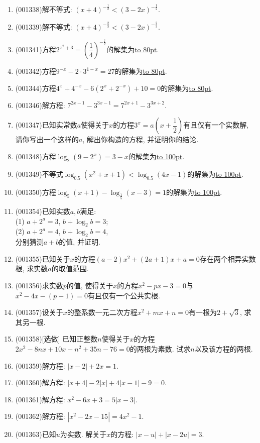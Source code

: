 \documentclass[10pt,a4paper]{article}
\newcommand{\blank}[1]{\underline{\hbox to #1pt{}}}
\begin{document}
\begin{enumerate}[1.]
\item {\tiny (001338)}解不等式: $(x+4)^{-\frac{1}{2}}<(3-2x)^{-\frac{1}{2}}$.
\item {\tiny (001339)}解不等式: $(x+4)^{-\frac{2}{3}}<(3-2x)^{-\frac{2}{3}}$.
\item {\tiny (001341)}方程$2^{x^2+3}=\left(\dfrac{1}{4}\right)^{-\frac{7}{2}}$的解集为\blank{80}.
\item {\tiny (001342)}方程$9^{-x}-2\cdot 3^{1-x}=27$的解集为\blank{80}.
\item {\tiny (001344)}方程$4^x+4^{-x}-6(2^x+2^{-x})+10=0$的解集为\blank{80}.
\item {\tiny (001346)}解方程: $7^{2x-1}-3^{3x-1}=7^{2x+1}-3^{3x+2}$.
\item {\tiny (001347)}已知实常数$a$使得关于$x$的方程$3^x=a\left(x+\dfrac{1}{2}\right)$有且仅有一个实数解, 请你写出一个这样的$a$, 解出你构造的方程, 并证明你的结论.
\item {\tiny (001348)}方程$\log_2(9-2^x)=3-x$的解集为\blank{100}.
\item {\tiny (001349)}不等式$\log_{0.5}(x^2+x+1)<\log_{0.5}(4x-1)$的解集为\blank{100}.
\item {\tiny (001350)}方程$\log_5(x+1)-\log_{\frac{1}{5}}(x-3)=1$的解集为\blank{100}.
\item {\tiny (001354)}已知实数$a,b$满足: \\ 
(1) $a+2^a=3$, $b+\log_2 b=3$;\\ 
(2) $a+2^a=4$, $b+\log_2 b=4$, \\ 
分别猜测$a+b$的值, 并证明.
\item {\tiny (001355)}已知关于$x$的方程$(a-2)x^2+(2a+1)x+a=0$存在两个相异实数根, 求实数$a$的取值范围.
\item {\tiny (001356)}求实数$p$的值, 使得关于$x$的方程$x^2-px-3=0$与$x^2-4x-(p-1)=0$有且仅有一个公共实根.
\item {\tiny (001357)}设关于$x$的整系数一元二次方程$x^2+mx+n=0$有一根为$2+\sqrt{3}$, 求其另一根.
\item {\tiny (001358)}[选做]
已知正整数$n$使得关于$x$的方程$2x^2-8nx+10x-n^2+35n-76=0$的两根为素数. 试求$n$以及该方程的两根.
\item {\tiny (001359)}解方程: $|x-2|+2x=1$.
\item {\tiny (001360)}解方程: $|x+4|-2|x|+4|x-1|-9=0$.
\item {\tiny (001361)}解方程: $x^2-6x+3=5|x-3|$.
\item {\tiny (001362)}解方程: $|x^2-2x-15|=4x^2-1$.
\item {\tiny (001363)}已知$u$为实数. 解关于$x$的方程: $|x-u|+|x-2u|=3$.

\end{enumerate}
\end{document}

